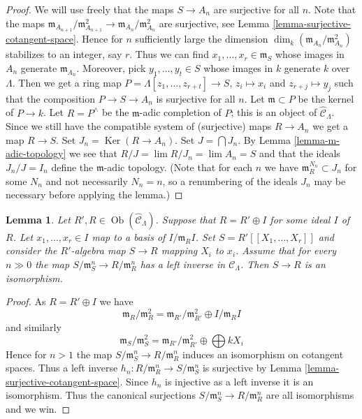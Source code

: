 \documentclass{stacks-project}
\theoremstyle{plain}
\newtheorem{lemma}[subsection]{Lemma}
\theoremstyle{definition}
\theoremstyle{remark}
\numberwithin{equation}{subsection}
\def\lim{\mathop{\mathrm{lim}}\nolimits}
\def\Ob{\mathop{\mathrm{Ob}}\nolimits}
\def\Ker{\mathop{\mathrm{Ker}}}
\begin{document}
\begin{proof}
We will use freely that the maps $S \to A_n$ are surjective for all $n$.
Note that the maps
$\mathfrak m_{A_{n + 1}}/\mathfrak m_{A_{n + 1}}^2 \to
\mathfrak m_{A_n}/\mathfrak m_{A_n}^2$ are surjective, see
Lemma \ref{lemma-surjective-cotangent-space}.
Hence for $n$ sufficiently large the dimension
$\dim_k (\mathfrak m_{A_n}/\mathfrak m_{A_n}^2)$ stabilizes to an
integer, say $r$.
Thus we can find $x_1, \ldots, x_r \in \mathfrak m_S$ whose images in
$A_n$ generate $\mathfrak m_{A_n}$. Moreover, pick $y_1, \ldots, y_t \in S$
whose images in $k$ generate $k$ over $\Lambda$. Then we get a ring map
$P = \Lambda[z_1, \ldots, z_{r + t}] \to S$, $z_i \mapsto x_i$ and
$z_{r + j} \mapsto y_j$ such that the composition
$P \to S \to A_n$ is surjective for all $n$. Let $\mathfrak m \subset P$
be the kernel of $P \to k$. Let $R = P^\wedge$ be the $\mathfrak m$-adic
completion of $P$; this is an object of $\widehat{\mathcal{C}}_\Lambda$.
Since we still have the compatible system of (surjective) maps $R \to A_n$
we get a map $R \to S$. Set $J_n = \Ker(R \to A_n)$.
Set $J = \bigcap J_n$. By
Lemma \ref{lemma-m-adic-topology}
we see that $R/J = \lim R/J_n = \lim A_n = S$
and that the ideals $J_n/J = I_n$ define the $\mathfrak m$-adic topology.
(Note that for each $n$ we have $\mathfrak m_R^{N_n} \subset J_n$ for
some $N_n$ and not necessarily $N_n = n$, so a renumbering of the ideals
$J_n$ may be necessary before applying the lemma.)
\end{proof}

\begin{lemma}
\label{lemma-power-series}
Let $R', R \in \Ob(\widehat{\mathcal{C}}_\Lambda)$. Suppose that
$R = R' \oplus I$ for some ideal $I$ of $R$. Let $x_1, \ldots, x_r \in I$
map to a basis of $I/\mathfrak m_R I$. Set $S = R'[[X_1, \ldots, X_r]]$
and consider the $R'$-algebra map $S \to R$ mapping $X_i$ to $x_i$.
Assume that for every $n \gg 0$ the map
$S/\mathfrak m_S^n \to R/\mathfrak m_R^n$ has a left inverse in
$\mathcal{C}_\Lambda$. Then $S \to R$ is an isomorphism.
\end{lemma}

\begin{proof}
As $R = R' \oplus I$ we have
$$
\mathfrak m_R/\mathfrak m_R^2 =
\mathfrak m_{R'}/\mathfrak m_{R'}^2 \oplus I/\mathfrak m_RI
$$
and similarly
$$
\mathfrak m_S/\mathfrak m_S^2 =
\mathfrak m_{R'}/\mathfrak m_{R'}^2 \oplus \bigoplus kX_i
$$
Hence for $n > 1$ the map $S/\mathfrak m_S^n \to R/\mathfrak m_R^n$
induces an isomorphism on cotangent spaces. Thus a left inverse
$h_n : R/\mathfrak m_R^n \to S/\mathfrak m_S^n$ is surjective by
Lemma \ref{lemma-surjective-cotangent-space}.
Since $h_n$ is injective as a left inverse it is an isomorphism.
Thus the canonical surjections $S/\mathfrak m_S^n \to R/\mathfrak m_R^n$
are all isomorphisms and we win.
\end{proof}
\end{document}
